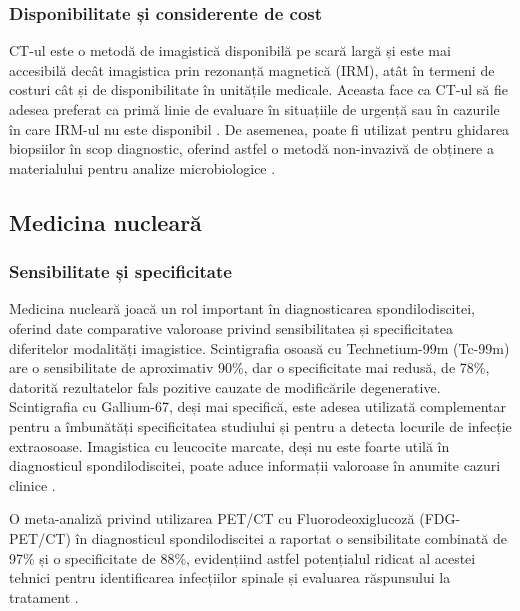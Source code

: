 \message{ !name(LaMain.tex)}\documentclass[romanian,12pt,a4paper]{article}
\begin{document}
\subsubsection{Disponibilitate și considerente de cost}

CT-ul este o metodă de imagistică disponibilă pe scară largă și este mai
accesibilă decât imagistica prin rezonanță magnetică (IRM), atât în
termeni de costuri cât și de disponibilitate în unitățile medicale.
Aceasta face ca CT-ul să fie adesea preferat ca primă linie de evaluare
în situațiile de urgență sau în cazurile în care IRM-ul nu este
disponibil \cite{ImagingCharacteristicsCT2022}. De asemenea, poate fi
utilizat pentru ghidarea biopsiilor în scop diagnostic, oferind astfel o
metodă non-invazivă de obținere a materialului pentru analize
microbiologice
\cite{ImagingCharacteristicsCT2022}\cite{ImagingAssessmentSpine2024}.

\subsection{Medicina nucleară}

\subsubsection{Sensibilitate și specificitate}

Medicina nucleară joacă un rol important în diagnosticarea
spondilodiscitei, oferind date comparative valoroase privind
sensibilitatea și specificitatea diferitelor modalități imagistice.
Scintigrafia osoasă cu Technetium-99m (Tc-99m) are o sensibilitate de
aproximativ 90\%, dar o specificitate mai redusă, de 78\%, datorită
rezultatelor fals pozitive cauzate de modificările degenerative.
Scintigrafia cu Gallium-67, deși mai specifică, este adesea utilizată
complementar pentru a îmbunătăți specificitatea studiului și pentru a
detecta locurile de infecție extraosoase. Imagistica cu leucocite
marcate, deși nu este foarte utilă în diagnosticul spondilodiscitei,
poate aduce informații valoroase în anumite cazuri clinice
\cite{RadionuclideImagingMusculoskeletal2016}\cite{RoleNuclearMedicine2012}\cite{ImagingAssessmentSpine2024}
.

O meta-analiză privind utilizarea PET/CT cu Fluorodeoxiglucoză
(FDG-PET/CT) în diagnosticul spondilodiscitei a raportat o sensibilitate
combinată de 97\% și o specificitate de 88\%, evidențiind astfel
potențialul ridicat al acestei tehnici pentru identificarea infecțiilor
spinale și evaluarea răspunsului la tratament
\cite{ImagingAssessmentSpine2024}.
\end{document}
